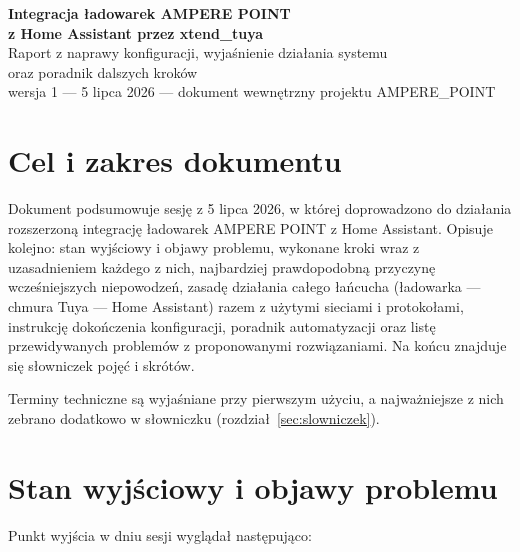 \documentclass[11pt,a4paper]{article}
\begin{document}
\begin{center}
{\huge\bfseries\sffamily\color{navy} Integracja ładowarek AMPERE POINT\\[2pt] z Home Assistant przez xtend\_tuya}\\[8pt]
{\large Raport z naprawy konfiguracji, wyjaśnienie działania systemu\\ oraz poradnik dalszych kroków}\\[6pt]
{\normalsize wersja 1 --- 5 lipca 2026 --- dokument wewnętrzny projektu AMPERE\_POINT}
\end{center}

\vspace{4pt}
\tableofcontents
\newpage

\section{Cel i zakres dokumentu}

Dokument podsumowuje sesję z 5 lipca 2026, w której doprowadzono do działania rozszerzoną integrację ładowarek AMPERE POINT z Home Assistant. Opisuje kolejno: stan wyjściowy i objawy problemu, wykonane kroki wraz z uzasadnieniem każdego z nich, najbardziej prawdopodobną przyczynę wcześniejszych niepowodzeń, zasadę działania całego łańcucha (ładowarka --- chmura Tuya --- Home Assistant) razem z użytymi sieciami i protokołami, instrukcję dokończenia konfiguracji, poradnik automatyzacji oraz listę przewidywanych problemów z proponowanymi rozwiązaniami. Na końcu znajduje się słowniczek pojęć i skrótów.

Terminy techniczne są wyjaśniane przy pierwszym użyciu, a najważniejsze z nich zebrano dodatkowo w słowniczku (rozdział~\ref{sec:slowniczek}).

\section{Stan wyjściowy i objawy problemu}

Punkt wyjścia w dniu sesji wyglądał następująco:
\end{document}
